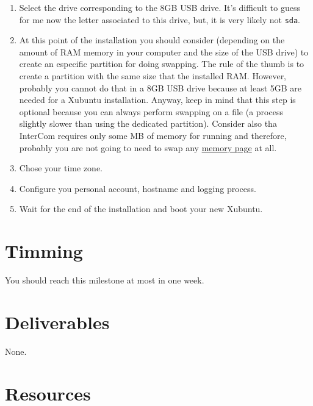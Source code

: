 \begin{enumerate}
\item Select the drive corresponding to the 8GB USB drive. It's
  difficult to guess for me now the letter associated to this drive,
  but, it is very likely not \texttt{sda}.

\item At this point of the installation you should consider (depending
  on the amount of RAM memory in your computer and the size of the USB
  drive) to create an especific partition for doing swapping. The rule
  of the thumb is to create a partition with the same size that the
  installed RAM. However, probably you cannot do that in a 8GB USB
  drive because at least 5GB are needed for a Xubuntu
  installation. Anyway, keep in mind that this step is optional
  because you can always perform swapping on a file (a process
  slightly slower than using the dedicated partition). Consider also
  tha InterCom requires only some MB of memory for running and
  therefore, probably you are not going to need to swap any
  \href{https://en.wikipedia.org/wiki/Page_(computer_memory)}{memory
    page} at all.

\item Chose your time zone.
  
\item Configure you personal account, hostname and logging process.
  
\item Wait for the end of the installation and boot your new Xubuntu.
  
\end{enumerate}

\section{Timming}

You should reach this milestone at most in one week.

\section{Deliverables}

None.

\section{Resources}


